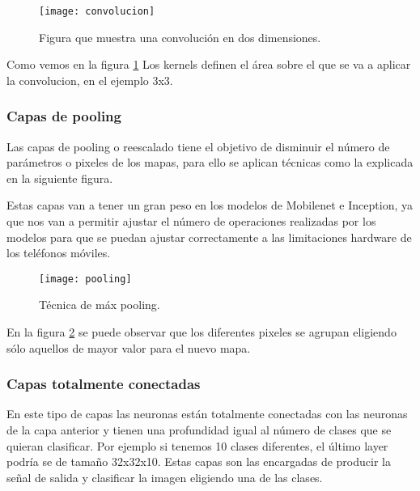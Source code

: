 \begin{figure}[h]
    \begin{center}%
        \begin{center}%
          \texttt{[image: convolucion]}%
          \caption{Figura que muestra una convolución en dos dimensiones.}%
          \label{figconvolucion}%
        \end{center}%
  	\end{center}%
\end{figure}%
 
Como vemos en la figura \ref{figconvolucion} Los kernels definen el área sobre el que se va a aplicar la convolucion, en el ejemplo 3x3.

\subsubsection{Capas de pooling}

Las capas de pooling o reescalado tiene el objetivo de disminuir el número de parámetros o pixeles de los mapas, para ello se aplican técnicas como la explicada en la siguiente figura.

Estas capas van a tener un gran peso en los modelos de Mobilenet e Inception, ya que nos van a permitir ajustar el número de operaciones realizadas por los modelos para que se puedan ajustar correctamente a las limitaciones hardware de los teléfonos móviles.

\begin{figure}[h]
    \begin{center}%
        \begin{center}%
          \texttt{[image: pooling]}%
          \caption{Técnica de máx pooling.}%
          \label{figpooling}%
        \end{center}%
  	\end{center}%
\end{figure}%

En la figura \ref{figpooling} se puede observar que los diferentes pixeles se agrupan eligiendo sólo aquellos de mayor valor para el nuevo mapa.

\subsubsection{Capas totalmente conectadas}

En este tipo de capas las neuronas están totalmente conectadas con las neuronas de la capa anterior y tienen una profundidad igual al número de clases que se quieran clasificar. Por ejemplo si tenemos 10 clases diferentes, el último layer podría se de tamaño 32x32x10. Estas capas son las encargadas de producir la señal de salida y clasificar la imagen eligiendo una de las clases. 

